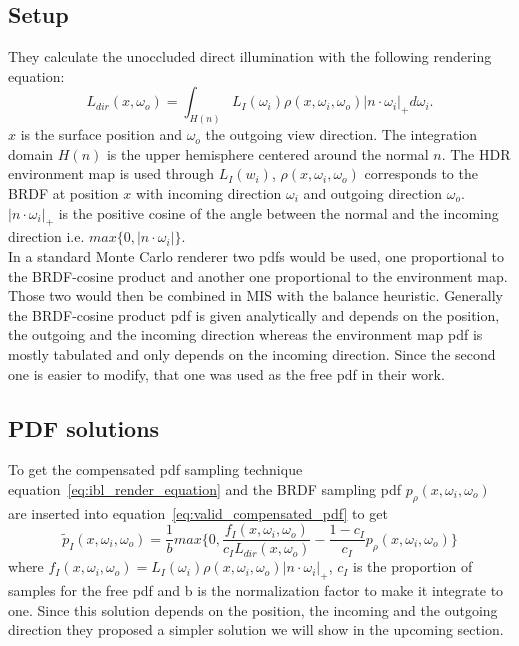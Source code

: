 \subsection{Setup}
\label{sec:ibl_setup}
They calculate the unoccluded direct illumination with the following rendering equation:
\begin{equation}
    \label{eq:ibl_render_equation}
    L_{dir}(x, \omega_o) = \int_{H(n)} L_I(\omega_i) \rho(x, \omega_i, \omega_o) |n \cdot \omega_i|_+ d\omega_i.
\end{equation}
$ x $ is the surface position and $ \omega_o $ the outgoing view direction.
The integration domain $ H(n) $ is the upper hemisphere centered around the normal $ n $.
The HDR environment map is used through $ L_I(w_i) $,
$ \rho(x, \omega_i, \omega_o) $ corresponds to the BRDF at position $ x $
with incoming direction $ \omega_i $ and outgoing direction $ \omega_o $.
$ |n \cdot \omega_i|_+ $ is the positive cosine of the angle between the normal and the incoming direction i.e. $ max\{0, |n \cdot \omega_i|\} $.\\
In a standard Monte Carlo renderer two pdfs would be used,
one proportional to the BRDF-cosine product and another one proportional to the environment map.
Those two would then be combined in MIS with the balance heuristic.
Generally the BRDF-cosine product pdf is given analytically and depends on the position, the outgoing and the incoming direction
whereas the environment map pdf is mostly tabulated and only depends on the incoming direction.
Since the second one is easier to modify,
that one was used as the free pdf in their work.


\subsection{PDF solutions}
\label{sec:ibl_pdfs}
To get the compensated pdf sampling technique equation~\ref{eq:ibl_render_equation}
and the BRDF sampling pdf $ p_{\rho}(x, \omega_i, \omega_o) $ are inserted into equation~\ref{eq:valid_compensated_pdf}
to get $$ \tilde{p}_I(x, \omega_i, \omega_o) = \frac{1}{b} max\{0, \frac{f_I(x, \omega_i, \omega_o)}{c_I L_{dir}(x, \omega_o)} - \frac{1 - c_I}{c_I} p_\rho(x, \omega_i, \omega_o)\} $$
where $ f_I(x, \omega_i, \omega_o) = L_I(\omega_i) \rho(x, \omega_i, \omega_o) |n \cdot \omega_i|_+ $,
$ c_I $ is the proportion of samples for the free pdf and b is the normalization factor to make it integrate to one.
Since this solution depends on the position, the incoming and the outgoing direction they proposed a simpler solution we will show in the upcoming section.


